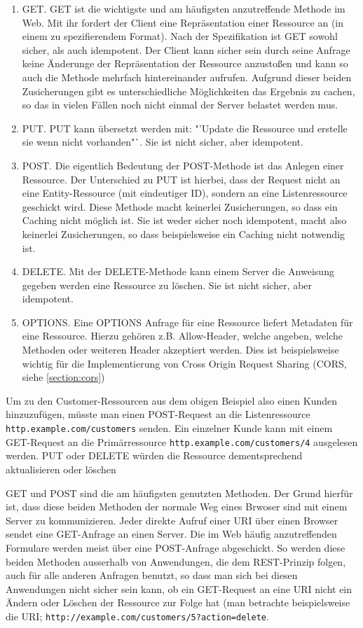 \begin{enumerate}
 \item GET. GET ist die wichtigste und am häufigsten anzutreffende Methode im Web. Mit ihr fordert der Client eine Repräsentation einer Ressource an (in einem zu spezifierendem Format). Nach der Spezifikation ist GET sowohl sicher, als auch idempotent. Der Client kann sicher sein durch seine Anfrage keine Änderunge der Repräsentation der Ressource anzustoßen und kann so auch die Methode mehrfach hintereinander aufrufen. Aufgrund dieser beiden Zusicherungen gibt es unterschiedliche Möglichkeiten das Ergebnis zu cachen, so das in vielen Fällen noch nicht einmal der Server belastet werden mus.
 \item PUT. PUT kann übersetzt werden mit: "'Update die Ressource und erstelle sie wenn nicht vorhanden"`. Sie ist nicht sicher, aber idempotent. 
 \item POST. Die eigentlich Bedeutung der POST-Methode ist das Anlegen einer Ressource. Der Unterschied zu PUT ist hierbei, dass der Request nicht an eine Entity-Ressource (mit eindeutiger ID), sondern an eine Listenressource geschickt wird. Diese Methode macht keinerlei Zusicherungen, so dass ein Caching nicht möglich ist. Sie ist weder sicher noch idempotent, macht also keinerlei Zusicherungen, so dass beispielsweise ein Caching nicht notwendig ist.
 \item DELETE. Mit der DELETE-Methode kann einem Server die Anweisung gegeben werden eine Ressource zu löschen. Sie ist nicht sicher, aber idempotent.
 \item OPTIONS. Eine OPTIONS Anfrage für eine Ressource liefert Metadaten für eine Ressource. Hierzu gehören z.B. Allow-Header, welche angeben, welche Methoden oder weiteren Header akzeptiert werden. Dies ist beispielsweise wichtig für die Implementierung von Cross Origin Request Sharing (CORS, siehe \ref{section:cors})
\end{enumerate}

Um zu den Customer-Ressourcen aus dem obigen Beispiel also einen Kunden hinzuzufügen, müsste man einen POST-Request an die Listenressource \texttt{http.example.com/customers} senden. Ein einzelner Kunde kann mit einem GET-Request an die Primärressource \texttt{http.example.com/customers/4} ausgelesen werden. PUT oder DELETE würden die Ressource dementsprechend aktualisieren oder löschen

GET und POST sind die am häufigsten genutzten Methoden. Der Grund hierfür ist, dass diese beiden Methoden der normale Weg eines Brwoser sind mit einem Server zu kommunizieren. Jeder direkte Aufruf einer URI über einen Browser sendet eine GET-Anfrage an einen Server. Die im Web häufig anzutreffenden Formulare werden meist über eine POST-Anfrage abgeschickt. So werden diese beiden Methoden ausserhalb von Anwendungen, die dem REST-Prinzip folgen, auch für alle anderen Anfragen benutzt, so dass man sich bei diesen Anwendungen nicht sicher sein kann, ob ein GET-Request an eine URI nicht ein Ändern oder Löschen der Ressource zur Folge hat (man betrachte beispielsweise die URI; \texttt{http://example.com/customers/5?action=delete}.

